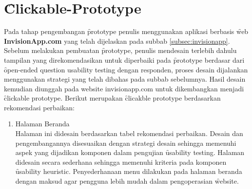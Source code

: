 \section{\f{Clickable-Prototype}}
Pada tahap pengembangan \f{prototype} penulis menggunakan aplikasi berbasis \f{web} \textbf{InvisionApp.com} yang telah dijelaskan pada subbab \ref{subsec:invisionapp}. Sebelum melakukan pembuatan \f{prototype}, penulis mendesain terlebih dahulu tampilan yang direkomendasikan untuk diperbaiki pada \f{prototype} berdasar dari \f{open-ended question usability testing} dengan responden, proses desain dijalankan menggunakan strategi yang telah dibahas pada subbab sebelumnya. Hasil desain kemudian diunggah pada website invisionapp.com untuk dikembangkan menjadi \f{clickable prototype}. Berikut merupakan \f{clicakble prototype} berdasarkan rekomendasi perbaikan:
\begin{enumerate}
	\item Halaman Beranda \\
	Halaman ini didesain berdasarkan tabel rekomendasi perbaikan. Desain dan pengembangannya disesuaikan dengan strategi desain sehingga memenuhi aspek yang dijadikan komponen dalam pengujian \f{usability testing}. Halaman didesain secara sederhana sehingga memenuhi kriteria pada komponen \f{usability heuristic}. Penyederhanaan menu dilakukan pada halaman beranda dengan maksud agar pengguna lebih mudah dalam pengoperasian \f{website}.
	\begin{figure}
		\centering

\end{figure}
\end{enumerate}
